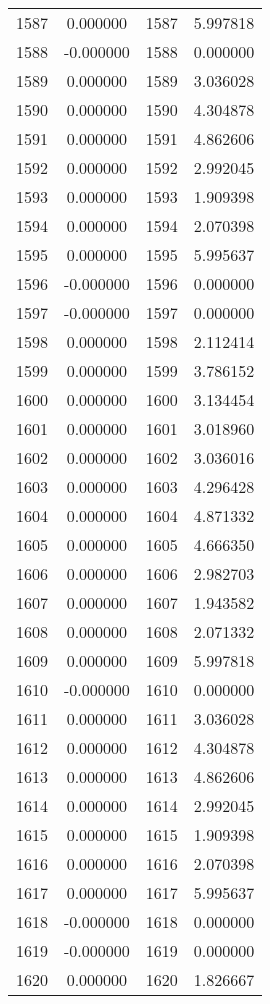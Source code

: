 \documentclass[12pt]{article}
\begin{document}
\begin{longtable}{@{}cccc@{}}
1587 & 0.000000 & 1587 & 5.997818 \\
1588 & -0.000000 & 1588 & 0.000000 \\
1589 & 0.000000 & 1589 & 3.036028 \\
1590 & 0.000000 & 1590 & 4.304878 \\
1591 & 0.000000 & 1591 & 4.862606 \\
1592 & 0.000000 & 1592 & 2.992045 \\
1593 & 0.000000 & 1593 & 1.909398 \\
1594 & 0.000000 & 1594 & 2.070398 \\
1595 & 0.000000 & 1595 & 5.995637 \\
1596 & -0.000000 & 1596 & 0.000000 \\
1597 & -0.000000 & 1597 & 0.000000 \\
1598 & 0.000000 & 1598 & 2.112414 \\
1599 & 0.000000 & 1599 & 3.786152 \\
1600 & 0.000000 & 1600 & 3.134454 \\
1601 & 0.000000 & 1601 & 3.018960 \\
1602 & 0.000000 & 1602 & 3.036016 \\
1603 & 0.000000 & 1603 & 4.296428 \\
1604 & 0.000000 & 1604 & 4.871332 \\
1605 & 0.000000 & 1605 & 4.666350 \\
1606 & 0.000000 & 1606 & 2.982703 \\
1607 & 0.000000 & 1607 & 1.943582 \\
1608 & 0.000000 & 1608 & 2.071332 \\
1609 & 0.000000 & 1609 & 5.997818 \\
1610 & -0.000000 & 1610 & 0.000000 \\
1611 & 0.000000 & 1611 & 3.036028 \\
1612 & 0.000000 & 1612 & 4.304878 \\
1613 & 0.000000 & 1613 & 4.862606 \\
1614 & 0.000000 & 1614 & 2.992045 \\
1615 & 0.000000 & 1615 & 1.909398 \\
1616 & 0.000000 & 1616 & 2.070398 \\
1617 & 0.000000 & 1617 & 5.995637 \\
1618 & -0.000000 & 1618 & 0.000000 \\
1619 & -0.000000 & 1619 & 0.000000 \\
1620 & 0.000000 & 1620 & 1.826667 \\

\end{longtable}
\end{document}
